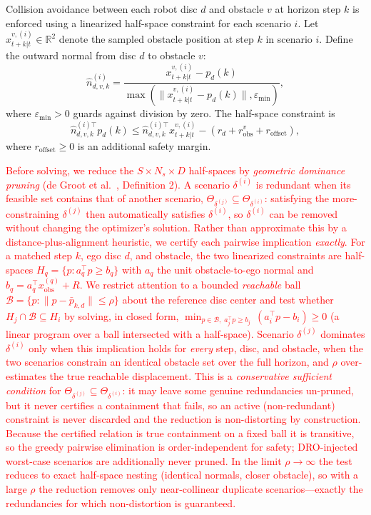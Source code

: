 \documentclass[letterpaper,10pt,conference]{ieeeconf}
\newcommand{\chg}[1]{\textcolor{red}{#1}}
\begin{document}
Collision avoidance between each robot disc $d$ and obstacle $v$ at horizon step $k$
is enforced using a linearized half-space constraint for each scenario $i$.
Let $x^{v,(i)}_{t+k|t}\in\mathbb{R}^2$ denote the sampled obstacle position at step $k$ in
scenario $i$. Define the outward normal from disc $d$ to obstacle $v$:
\begin{equation}\label{eq:normal}
\hat{n}_{d,v,k}^{(i)} =
\frac{x^{v,(i)}_{t+k|t} - p_d(k)}
{\max\!\left(\|x^{v,(i)}_{t+k|t} - p_d(k)\|, \varepsilon_{\min}\right)},
\end{equation}
where $\varepsilon_{\min} > 0$ guards against division by zero. The half-space
constraint is
\begin{equation}\label{eq:halfspace}
\hat{n}_{d,v,k}^{(i)\top} p_d(k)
\le
\hat{n}_{d,v,k}^{(i)\top} x^{v,(i)}_{t+k|t}
- (r_d + r_{\mathrm{obs}}^v + r_{\mathrm{offset}}),
\end{equation}
where $r_{\mathrm{offset}}\ge 0$ is an additional safety margin.

\chg{Before solving, we reduce the $S\!\times\!N_s\!\times\!D$ half-spaces by \emph{geometric dominance pruning} (de Groot et al.\ \cite{degroot2023SBMotionBounded}, Definition 2). A scenario $\delta^{(i)}$ is redundant when its feasible set contains that of another scenario, $\Theta_{\delta^{(j)}}\subseteq\Theta_{\delta^{(i)}}$: satisfying the more-constraining $\delta^{(j)}$ then automatically satisfies $\delta^{(i)}$, so $\delta^{(i)}$ can be removed without changing the optimizer's solution. Rather than approximate this by a distance-plus-alignment heuristic, we certify each pairwise implication \emph{exactly}. For a matched step $k$, ego disc $d$, and obstacle, the two linearized constraints are half-spaces $H_q=\{p:a_q^\top p\ge b_q\}$ with $a_q$ the unit obstacle-to-ego normal and $b_q=a_q^\top x_{\text{obs}}^{(q)}+R$. We restrict attention to a bounded \emph{reachable} ball $\mathcal B=\{p:\lVert p-\bar p_{k,d}\rVert\le\rho\}$ about the reference disc center and test whether $H_j\cap\mathcal B\subseteq H_i$ by solving, in closed form, $\min_{p\in\mathcal B,\;a_j^\top p\ge b_j}\,(a_i^\top p-b_i)\ge 0$ (a linear program over a ball intersected with a half-space). Scenario $\delta^{(j)}$ dominates $\delta^{(i)}$ only when this implication holds for \emph{every} step, disc, and obstacle, when the two scenarios constrain an identical obstacle set over the full horizon, and $\rho$ over-estimates the true reachable displacement. This is a \emph{conservative sufficient condition} for $\Theta_{\delta^{(j)}}\subseteq\Theta_{\delta^{(i)}}$: it may leave some genuine redundancies un-pruned, but it never certifies a containment that fails, so an active (non-redundant) constraint is never discarded and the reduction is non-distorting by construction. Because the certified relation is true containment on a fixed ball it is transitive, so the greedy pairwise elimination is order-independent for safety; DRO-injected worst-case scenarios are additionally never pruned. In the limit $\rho\to\infty$ the test reduces to exact half-space nesting (identical normals, closer obstacle), so with a large $\rho$ the reduction removes only near-collinear duplicate scenarios---exactly the redundancies for which non-distortion is guaranteed.}
\end{document}
